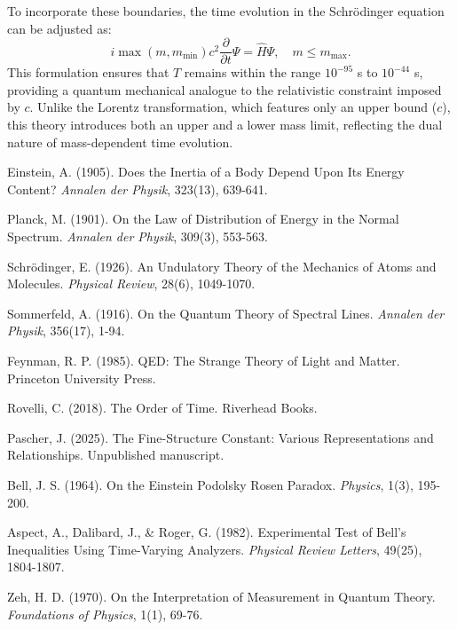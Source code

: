 \documentclass{article}
\begin{document}
To incorporate these boundaries, the time evolution in the Schr\"odinger equation can be adjusted as:
\begin{equation}
	i \max(m, m_{\text{min}}) c^2 \frac{\partial}{\partial t} \Psi = \hat{H} \Psi, \quad m \leq m_{\text{max}}.
\end{equation}
This formulation ensures that $T$ remains within the range $10^{-95}$ s to $10^{-44}$ s, providing a quantum mechanical analogue to the relativistic constraint imposed by $c$. Unlike the Lorentz transformation, which features only an upper bound ($c$), this theory introduces both an upper and a lower mass limit, reflecting the dual nature of mass-dependent time evolution.	
	\begin{thebibliography}{9}
		
		 Einstein, A. (1905). Does the Inertia of a Body Depend Upon Its Energy Content? \textit{Annalen der Physik}, 323(13), 639-641.
		
		 Planck, M. (1901). On the Law of Distribution of Energy in the Normal Spectrum. \textit{Annalen der Physik}, 309(3), 553-563.
		
		 Schrödinger, E. (1926). An Undulatory Theory of the Mechanics of Atoms and Molecules. \textit{Physical Review}, 28(6), 1049-1070.
		
		 Sommerfeld, A. (1916). On the Quantum Theory of Spectral Lines. \textit{Annalen der Physik}, 356(17), 1-94.
		
		 Feynman, R. P. (1985). QED: The Strange Theory of Light and Matter. Princeton University Press.
		
		 Rovelli, C. (2018). The Order of Time. Riverhead Books.
		
		 Pascher, J. (2025). The Fine-Structure Constant: Various Representations and Relationships. Unpublished manuscript.
		
		 Bell, J. S. (1964). On the Einstein Podolsky Rosen Paradox. \textit{Physics}, 1(3), 195-200.
		
		 Aspect, A., Dalibard, J., \& Roger, G. (1982). Experimental Test of Bell's Inequalities Using Time-Varying Analyzers. \textit{Physical Review Letters}, 49(25), 1804-1807.
		
		 Zeh, H. D. (1970). On the Interpretation of Measurement in Quantum Theory. \textit{Foundations of Physics}, 1(1), 69-76.
		
	\end{thebibliography}
	
\end{document}
